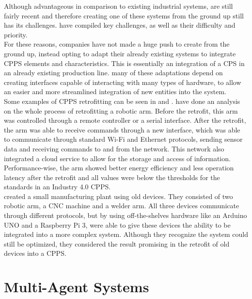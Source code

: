 Although advantageous in comparison to existing industrial systems,  are still fairly recent and therefore creating one of these systems from the ground up still has its challenges. \citeauthor{LEITAO201611} \cite{LEITAO201611} have compiled key challenges, as well as their difficulty and priority.\\

For these reasons, companies have not made a huge push to create  from the ground up, instead opting to adapt their already existing systems to integrate \acrshort{CPPS} elements and characteristics. This is essentially an integration of a \acrshort{CPS} in an already existing production line. many of these adaptations depend on creating interfaces capable of interacting with many types of hardware, to allow an easier and more streamlined integration of new entities into the system.\\

Some examples of \acrshort{CPPS} retrofitting can be seen in \citeauthor{CARDIN201911} \cite{CARDIN201911} and \citeauthor{8328326} \cite{8328326}. \citeauthor{CARDIN201911} \cite{CARDIN201911} have done an analysis on the whole process of retrofitting a robotic arm. Before the retrofit, this arm was controlled through a remote controller or a serial interface. After the retrofit, the arm was able to receive commands through a new interface, which was able to communicate through standard Wi-Fi and Ethernet protocols, sending sensor data and receiving commands to and from the network. This network also integrated a cloud service to allow for the storage and access of information. Performance-wise, the arm showed better energy efficiency and less operation latency after the retrofit and all values were below the thresholds for the standards in an Industry 4.0 \acrshort{CPPS}.\\

\citeauthor{8328326} \cite{8328326} created a small manufacturing plant using old devices. They consisted of two robotic arm, a CNC machine and a welder arm. All three devices communicate through different protocols, but by using off-the-shelves hardware like an Arduino UNO and a Raspberry Pi 3, \citeauthor{8328326} were able to give these devices the ability to be integrated into a more complex system. Although they recognize the system could still be optimized, they considered the result promising in the retrofit of old devices into a \acrshort{CPPS}.

\section{Multi-Agent Systems}
\label{sec:multi-agent_systems}

